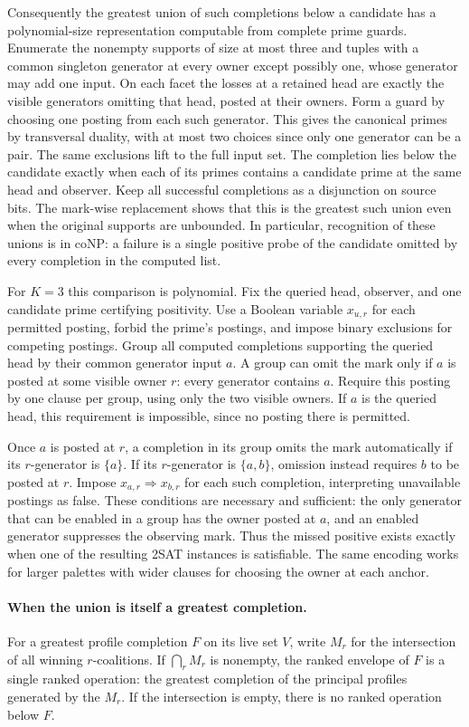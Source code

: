 Consequently the greatest union of such completions below a
candidate has a polynomial-size representation computable from
complete prime guards. Enumerate the nonempty supports of size at
most three and tuples with a common singleton generator at every
owner except possibly one, whose generator may add one input.
On each facet the losses at a retained head are exactly the
visible generators omitting that head, posted at their owners.
Form a guard by choosing one posting from each such generator.
This gives the canonical primes by transversal duality, with
at most two choices since only one generator can be a pair.
The same exclusions lift to the full input set. The completion
lies below the candidate exactly
when each of its primes contains a candidate prime at the same
head and observer. Keep all successful completions as a disjunction
on source bits. The mark-wise replacement shows that this is the
greatest such union even when the original supports are unbounded.
In particular, recognition of these unions is in coNP: a failure
is a single positive probe of the candidate omitted by every
completion in the computed list.

For $K=3$ this comparison is polynomial. Fix the queried
head, observer, and one candidate prime certifying positivity.
Use a Boolean variable $x_{u,r}$ for each permitted posting,
forbid the prime's postings, and impose binary exclusions for
competing postings. Group all computed completions supporting the
queried head by their common generator input $a$. A group can
omit the mark only if $a$ is posted at some visible owner $r$:
every generator contains $a$. Require this posting by one
clause per group, using only the two visible owners. If $a$ is
the queried head, this requirement is impossible, since no
posting there is permitted.

Once $a$ is posted at $r$, a completion in its group omits the
mark automatically if its $r$-generator is $\{a\}$. If its
$r$-generator is $\{a,b\}$, omission instead requires $b$ to
be posted at $r$. Impose $x_{a,r}\Rightarrow x_{b,r}$ for each
such completion, interpreting unavailable postings as false.
These conditions are necessary and sufficient: the only
generator that can be enabled in a group has the owner posted
at $a$, and an enabled generator suppresses the observing mark.
Thus the missed positive exists exactly when one of the
resulting 2SAT instances is satisfiable. The same encoding
works for larger palettes with wider clauses for choosing the
owner at each anchor.

\paragraph{When the union is itself a greatest completion.}
For a greatest profile completion $F$ on its live set $V$, write
$M_r$ for the intersection of all winning $r$-coalitions.
If $\bigcap_r M_r$ is nonempty, the ranked envelope of $F$
is a single ranked operation: the greatest completion of the
principal profiles generated by the $M_r$. If the intersection
is empty, there is no ranked operation below $F$.

